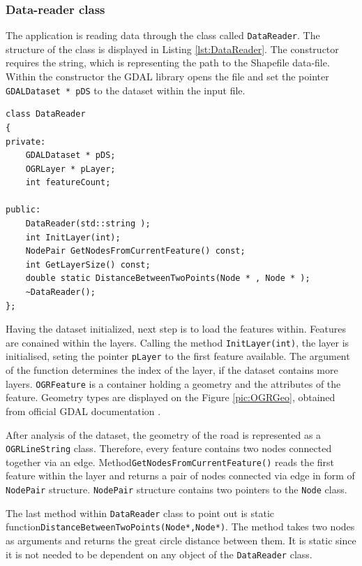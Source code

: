 \documentclass[thesis=M,english]{FITthesis}[2012/10/20]
\begin{document}
\subsubsection{Data-reader class}
The application is reading data through the class called \texttt{DataReader}. The structure of the class is displayed in Listing \ref{lst:DataReader}. The constructor requires the string, which is representing the path to the Shapefile data-file. Within the constructor the GDAL library opens the file and set the pointer \texttt{GDALDataset * pDS} to the dataset within the input file.

\begin{lstlisting}[frame=single, caption={\texttt{DataReader} class}, label={lst:DataReader}]
class DataReader
{
private:
    GDALDataset * pDS;
    OGRLayer * pLayer;
    int featureCount;

public:
    DataReader(std::string );
    int InitLayer(int);
    NodePair GetNodesFromCurrentFeature() const;
    int GetLayerSize() const;
    double static DistanceBetweenTwoPoints(Node * , Node * );
    ~DataReader();
};
\end{lstlisting}

Having the dataset initialized, next step is to load the features within. Features are conained within the layers. Calling the method \texttt{InitLayer(int)}, the layer is initialised, seting the pointer \texttt{pLayer} to the first feature available. The argument of the function determines the index of the layer, if the dataset contains more layers. \texttt{OGRFeature} is a container holding a geometry and the attributes of the feature. Geometry types are displayed on the Figure \ref{pic:OGRGeo}, obtained from official GDAL documentation \cite{GDAL17}. 



After analysis of the dataset, the geometry of the road is represented as a \texttt{OGRLineString} class. Therefore, every feature contains two nodes connected together via an edge. Method\texttt{GetNodesFromCurrentFeature()} reads the first feature within the layer and returns a pair of nodes connected via edge in form of \texttt{NodePair} structure. \texttt{NodePair} structure contains two pointers to the \texttt{Node} class. 

The last method within \texttt{DataReader} class to point out is static function\texttt{DistanceBetweenTwoPoints(Node*,Node*)}. The method takes two nodes as arguments and returns the great circle distance between them. It is static since it is not needed to be dependent on any object of the \texttt{DataReader} class.
\end{document}
